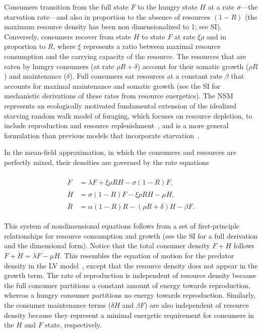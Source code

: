 \documentclass[twocolumn,preprintnumbers,amsmath,amssymb,superscriptaddress]{revtex4}
\begin{document}
Consumers transition from the full state $F$ to the hungry state $H$ at a
rate $\sigma$---the starvation rate---and also in proportion to the absence
of resources $(1-R)$ (the maximum resource density has been non
dimensionalized to 1; see SI).  Conversely, consumers recover from state $H$
to state $F$ at rate $\xi \rho$ and in proportion to $R$, where $\xi$
represents a ratio between maximal resource consumption and the carrying
capacity of the resource. %
The resources that are eaten by hungry consumers (at rate $\rho R + \delta$)
account for their somatic growth ($\rho R$) and maintenance ($\delta$).  Full
consumers eat resources at a constant rate $\beta$ that accounts for maximal
maintenance and somatic growth (see the SI for mechanistic derivations of
these rates from resource energetics).
The NSM represents an ecologically motivated fundamental extension of the
idealized starving random walk model of foraging, which focuses on resource
depletion, to include reproduction and resource
replenishment~\citep{Benichou:2014wu,Benichou:2016wl,Chupeau:2016jf}, and is
a more general formulation than previous models that incorporate
starvation~\citep{Persson:1998hz}.

In the mean-field approximation, in which the consumers and resources are
perfectly mixed, their densities are governed by the rate equations

\begin{align}
\label{eq:system}
\begin{split}
\dot{F} &= \lambda F + \xi \rho RH - \sigma \left(1-R\right)F,  \\
\dot{H} &= \sigma \left(1-R\right)F - \xi \rho RH - \mu H,  \\
\dot{R} &= \alpha \left(1-R\right)R -\left(\rho R+\delta\right)H-\beta F.
\end{split}
\end{align}

This system of nondimensional equations follows from a set of first-principle
relationships for resource consumption and growth (see the SI for a full derivation and the dimensional form).
Notice that the total consumer density $F+H$ follows $\dot{F}+\dot{H}=\lambda F-\mu H$.
This resembles the equation of motion for the predator density in the LV model~\citep{murray2011mathematical}, except that the resource density does not appear in the growth term.
The rate of reproduction is independent of resource density because the full
consumer partitions a constant amount of energy towards reproduction, whereas
a hungry consumer partitions no energy towards reproduction.  Similarly, the
consumer maintenance terms ($\delta H$ and $\beta F$) are also independent of
resource density because they represent a minimal energetic requirement for
consumers in the $H$ and $F$ state, respectively.
\end{document}

